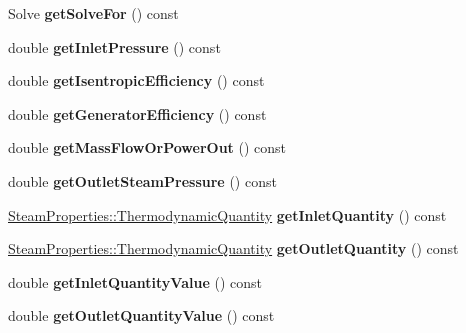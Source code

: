\begin{DoxyCompactItemize}
\item 
\mbox{\label{class_turbine_a58c73057a4b890eab2af2b42c82484e6}} 
Solve {\bfseries get\+Solve\+For} () const
\item 
\mbox{\label{class_turbine_a148ad3877851f1c3931d8a6771d750c5}} 
double {\bfseries get\+Inlet\+Pressure} () const
\item 
\mbox{\label{class_turbine_a5d907859de4acc153a32bd443238b445}} 
double {\bfseries get\+Isentropic\+Efficiency} () const
\item 
\mbox{\label{class_turbine_a92266fd994310d1842ba37c05bc40bf8}} 
double {\bfseries get\+Generator\+Efficiency} () const
\item 
\mbox{\label{class_turbine_a820a090d264b96ee84f717555545c287}} 
double {\bfseries get\+Mass\+Flow\+Or\+Power\+Out} () const
\item 
\mbox{\label{class_turbine_a1589b2364a553db7aaa875bb543d171d}} 
double {\bfseries get\+Outlet\+Steam\+Pressure} () const
\item 
\mbox{\label{class_turbine_ac9e91d9539cea5cd1e0037c397c28c78}} 
\hyperlink{class_steam_properties_ae0294bedf7d178c2d8fb6aed0f62fbff}{Steam\+Properties\+::\+Thermodynamic\+Quantity} {\bfseries get\+Inlet\+Quantity} () const
\item 
\mbox{\label{class_turbine_acd3e98ab67754b652de97498d9bec6d2}} 
\hyperlink{class_steam_properties_ae0294bedf7d178c2d8fb6aed0f62fbff}{Steam\+Properties\+::\+Thermodynamic\+Quantity} {\bfseries get\+Outlet\+Quantity} () const
\item 
\mbox{\label{class_turbine_a3d8a3f317fa71abb3404144371615725}} 
double {\bfseries get\+Inlet\+Quantity\+Value} () const
\item 
\mbox{\label{class_turbine_aca98f128213e02e95dfd6f4b2ad8de4e}} 
double {\bfseries get\+Outlet\+Quantity\+Value} () const
\item 
\mbox{\label{class_turbine_a14f6eff49b501aa8c5a22d404dbeaac0}} 

\end{DoxyCompactItemize}

